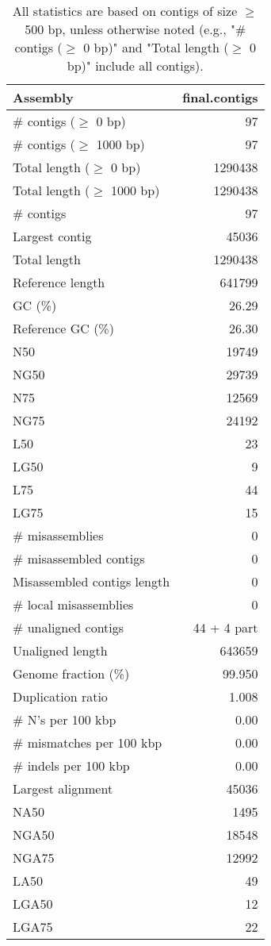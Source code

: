 \documentclass[12pt,a4paper]{article}
\begin{document}
\begin{table}[ht]
\begin{center}
\caption{All statistics are based on contigs of size $\geq$ 500 bp, unless otherwise noted (e.g., "\# contigs ($\geq$ 0 bp)" and "Total length ($\geq$ 0 bp)" include all contigs).}
\begin{tabular}{|l*{1}{|r}|}
\hline
Assembly & final.contigs \\ \hline
\# contigs ($\geq$ 0 bp) & 97 \\ \hline
\# contigs ($\geq$ 1000 bp) & 97 \\ \hline
Total length ($\geq$ 0 bp) & 1290438 \\ \hline
Total length ($\geq$ 1000 bp) & 1290438 \\ \hline
\# contigs & 97 \\ \hline
Largest contig & 45036 \\ \hline
Total length & 1290438 \\ \hline
Reference length & 641799 \\ \hline
GC (\%) & 26.29 \\ \hline
Reference GC (\%) & 26.30 \\ \hline
N50 & 19749 \\ \hline
NG50 & 29739 \\ \hline
N75 & 12569 \\ \hline
NG75 & 24192 \\ \hline
L50 & 23 \\ \hline
LG50 & 9 \\ \hline
L75 & 44 \\ \hline
LG75 & 15 \\ \hline
\# misassemblies & 0 \\ \hline
\# misassembled contigs & 0 \\ \hline
Misassembled contigs length & 0 \\ \hline
\# local misassemblies & 0 \\ \hline
\# unaligned contigs & 44 + 4 part \\ \hline
Unaligned length & 643659 \\ \hline
Genome fraction (\%) & 99.950 \\ \hline
Duplication ratio & 1.008 \\ \hline
\# N's per 100 kbp & 0.00 \\ \hline
\# mismatches per 100 kbp & 0.00 \\ \hline
\# indels per 100 kbp & 0.00 \\ \hline
Largest alignment & 45036 \\ \hline
NA50 & 1495 \\ \hline
NGA50 & 18548 \\ \hline
NGA75 & 12992 \\ \hline
LA50 & 49 \\ \hline
LGA50 & 12 \\ \hline
LGA75 & 22 \\ \hline
\end{tabular}
\end{center}
\end{table}
\end{document}
